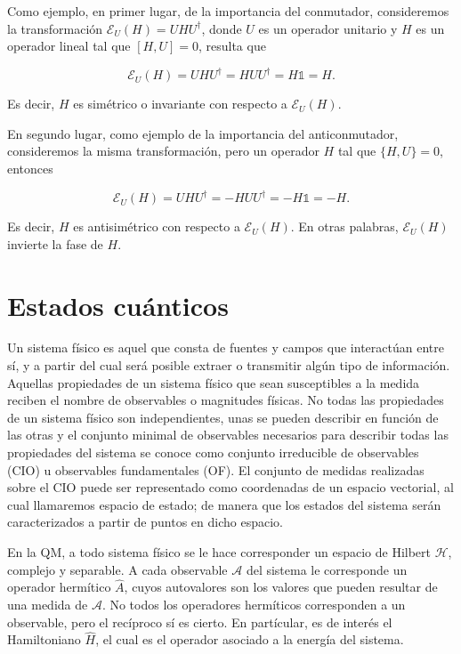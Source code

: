 Como ejemplo, en primer lugar, de la importancia del conmutador, consideremos la transformación $\mathcal{E}_U(H) = U H U^\dagger$, donde $U$ es un operador unitario y $H$ es un operador lineal tal que $[H,U] = 0$, resulta que

\begin{equation}
    \mathcal{E}_U(H) = U H U^\dagger = H U U^\dagger = H \mathds{1} = H .
\end{equation}

Es decir, $H$ es simétrico o invariante con respecto a $\mathcal{E}_U(H)$.

En segundo lugar, como ejemplo de la importancia del anticonmutador, consideremos la misma transformación, pero un operador $H$ tal que $\{H,U\} = 0$, entonces

\begin{equation}
    \mathcal{E}_U(H) = U H U^\dagger = - H U U^\dagger = - H \mathds{1} = - H .
\end{equation}

Es decir, $H$ es antisimétrico con respecto a $\mathcal{E}_U(H)$. En otras palabras, $\mathcal{E}_U(H)$ invierte la fase de $H$.

\section{Estados cuánticos}

Un sistema físico es aquel que consta de fuentes y campos que interactúan entre sí, y a partir del cual será posible extraer o transmitir algún tipo de información. Aquellas propiedades de un sistema físico que sean susceptibles a la medida reciben el nombre de observables o magnitudes físicas. No todas las propiedades de un sistema físico son independientes, unas se pueden describir en función de las otras y el conjunto minimal de observables necesarios para describir todas las propiedades del sistema se conoce como conjunto irreducible de observables (CIO) u observables fundamentales (OF). El conjunto de medidas realizadas sobre el CIO puede ser representado como coordenadas de un espacio vectorial, al cual llamaremos espacio de estado; de manera que los estados del sistema serán caracterizados a partir de puntos en dicho espacio.

En la QM, a todo sistema físico se le hace corresponder un espacio de Hilbert $\mathcal{H}$, complejo y separable. A cada observable $\mathcal{A}$ del sistema le corresponde un operador hermítico $\hat{A}$, cuyos autovalores son los valores que pueden resultar de una medida de $\mathcal{A}$. No todos los operadores hermíticos corresponden a un observable, pero el recíproco sí es cierto. En partícular, es de interés el Hamiltoniano $\hat{H}$, el cual es el operador asociado a la energía del sistema.

